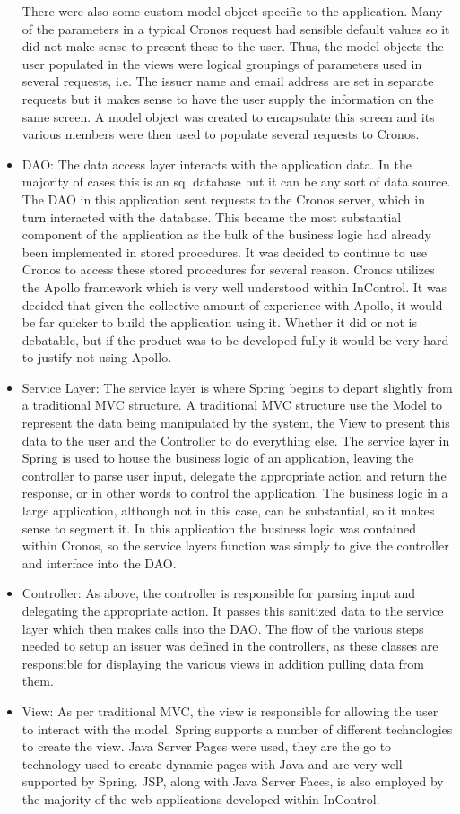 \documentclass[a4paper, 11pt, titlepage]{article}
\begin{document}
\begin{itemize}
There were also some custom model object specific to the application. Many of the parameters in a typical Cronos request had sensible default values so it did not make sense to present these to the user. Thus, the model objects the user populated in the views were logical groupings of parameters used in several requests, i.e. The issuer name and email address are set in separate requests but it makes sense to have the user supply the information on the same screen. A model object was created to encapsulate this screen and its various members were then used to populate several requests to Cronos. 
\item DAO: The data access layer interacts with the application data. In the majority of cases this is an sql database but it can be any sort of data source. The DAO in this application sent requests to the Cronos server, which in turn interacted with the database. This became the most substantial component of the application as the bulk of the business logic had already been implemented in stored procedures. It was decided to continue to use Cronos to access these stored procedures for several reason. Cronos utilizes the Apollo framework which is very well understood within InControl. It was decided that given the collective amount of experience with Apollo, it would be far quicker to build the application using it. Whether it did or not is debatable, but if the product was to be developed fully it would be very hard to justify not using Apollo. 
\item Service Layer: The service layer is where Spring begins to depart slightly from a traditional MVC structure. A traditional MVC structure use the Model to represent the data being manipulated by the system, the View to present this data to the user and the Controller to do everything else. The service layer in Spring is used to house the business logic of an application, leaving the controller to parse user input, delegate the appropriate action and return the response, or in other words to control the application. The business logic in a large application, although not in this case, can be substantial, so it makes sense to segment it. In this application the business logic was contained within Cronos, so the service layers function was simply to give the controller and interface into the DAO. 
\item Controller: As above, the controller is responsible for parsing input and delegating the appropriate action. It passes this sanitized data to the service layer which then makes calls into the DAO. The flow of the various steps needed to setup an issuer was defined in the controllers, as these classes are responsible for displaying the various views in addition pulling data from them. 
\item View: As per traditional MVC, the view is responsible for allowing the user to interact with the model. Spring supports a number of different technologies to create the view. Java Server Pages were used, they are the go to technology used to create dynamic pages with Java and are very well supported by Spring. JSP, along with Java Server Faces, is also employed by the majority of the web applications developed within InControl. 
\end{itemize} 
 
\end{document}
